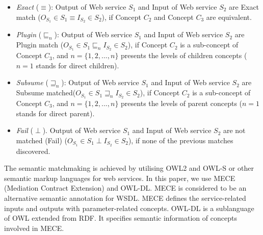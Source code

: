 \documentclass{IEEEtran}
\begin{document}
\begin{itemize}
\item \textit{Exact} ($\equiv$): Output of Web service $S_{1}$ and Input of Web service $S_{2}$ are Exact match ($ O_{S_1} \in S_{1} \equiv I_{S_2} \in S_{2}$), if  Concept $C_{2}$ and Concept $C_{3}$ are equivalent.
\item \textit{Plugin} ($\sqsubseteq_{n}$): Output of Web service $S_{1}$ and Input of Web service $S_{2}$ are Plugin match ($O_{S_1} \in S_{1} \sqsubseteq_{n} I_{S_2} \in S_{2}$), if  Concept $C_{2}$ is a sub-concept of Concept $C_{3}$, and $n = \{1,2,...,n \}$ presents the levels of children concepts ($n=1$ stands for direct children).
\item \textit{Subsume} ($\sqsupseteq_{n}$): Output of Web service $S_{1}$ and Input of Web service $S_{2}$ are Subsume matched($O_{S_1} \in S_{1} \sqsupseteq_{n} I_{S_2} \in S_{2}$), if  Concept $C_{2}$ is a sub-concept of  Concept $C_{3}$, and $n = \{1,2,...,n \}$ presents the levels of parent concepts ($n=1$ stands for direct parent).
\item \textit{Fail} ($\perp$). Output of Web service $S_{1}$ and Input of Web service $S_{2}$ are not matched (Fail) ($O_{S_1} \in S_{1} \perp I_{S_2} \in S_{2}$), if none of the previous matches discovered.
\end{itemize}

The semantic matchmaking is achieved by utilising OWL2 and OWL-S or other semantic markup languages for web services. In this paper, we use MECE (Mediation Contract Extension) \cite{bleul2008self} and OWL-DL. MECE is considered to be an alternative semantic annotation for WSDL. MECE defines the service-related inputs and outputs with parameter-related concepts. OWL-DL is a sublanguage of OWL extended from RDF. It specifies semantic information of concepts involved in MECE.
\end{document}
